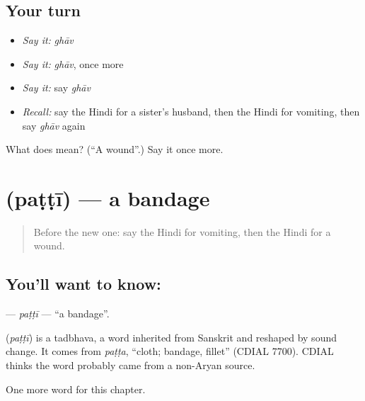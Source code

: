 \subsection*{Your turn}
\begin{itemize}
\raggedright
  \item \emph{Say it:} \emph{ghāv}
  \item \emph{Say it:} \emph{ghāv}, once more
  \item \emph{Say it:} say \emph{ghāv}
  \item \emph{Recall:} say the Hindi for a sister's husband, then the Hindi for vomiting, then say \emph{ghāv} again
\end{itemize}

\begin{tcolorbox}[breakable,colback=teal!4,colframe=teal!35!black,title={Before you move on}]
What does  mean? (\textquotedblleft{}A wound\textquotedblright{}.) Say it once more.
\end{tcolorbox}
\section[\texorpdfstring{\hi{पट्टी} (paṭṭī)}{पट्टी (paṭṭī)}]{ (paṭṭī) — a bandage}

\label{lesson:HI-C256-patti}



\begin{quote}
Before the new one: say the Hindi for vomiting, then the Hindi for a wound.
\end{quote}

\subsection*{You'll want to know: }
\textbf{} — \emph{paṭṭī} — \textquotedblleft{}a bandage\textquotedblright{}.

\begin{cousinweb}
\textbf{} (\emph{paṭṭī}) is a tadbhava, a word inherited from Sanskrit and reshaped by sound change. It comes from \emph{paṭṭa}, \textquotedblleft{}cloth; bandage, fillet\textquotedblright{} (CDIAL 7700). CDIAL thinks the word probably came from a non-Aryan source.
\end{cousinweb}

\begin{grammarlens}[title={What you've built}]
One more word for this chapter.
\end{grammarlens}

